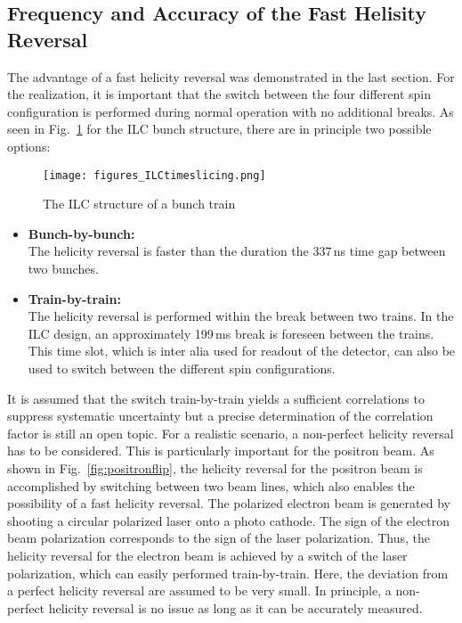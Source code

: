 \documentclass[a4paper]{article}
\begin{document}
\subsection{Frequency and Accuracy of the Fast Helisity Reversal}

The advantage of a fast helicity reversal was demonstrated in the last section. For the realization, it is important that the switch between the four different spin configuration is performed during normal operation with no additional breaks. As seen in Fig.~\ref{fig:bunchstrcture} for the ILC bunch structure, there are in principle two possible options:

\begin{figure}[htbp]
\centering
\texttt{[image: figures\_ILCtimeslicing.png]}
\caption{The ILC structure of a bunch train}
\label{fig:bunchstrcture}
\end{figure}

\begin{itemize}
	\item\textbf{Bunch-by-bunch:}\\
	The helicity reversal is faster than the duration the 337\,ns time gap between two bunches.
	\item\textbf{Train-by-train:}\\
	The helicity reversal is performed within the break between two trains. In the ILC design, an approximately 199\,ms break is foreseen between the trains. This time slot, which is inter alia used for readout of the detector, can also be used to switch between the different spin configurations.  
\end{itemize}

It is assumed that the switch train-by-train yields a sufficient correlations to suppress systematic uncertainty but a precise determination of the correlation factor is still an open topic. For a realistic scenario, a non-perfect helicity reversal has to be considered. This is particularly important for the positron beam. As shown in Fig.~\ref{fig:positronflip}, the helicity reversal for the positron beam is accomplished by switching between two beam lines, which also enables the possibility of a fast helicity reversal. The polarized electron beam is generated by shooting a circular polarized laser onto a photo cathode. The sign of the electron beam polarization corresponds to the sign of the laser polarization. Thus, the helicity reversal for the electron beam is achieved by a switch of the laser polarization, which can easily performed train-by-train. Here, the deviation from a perfect helicity reversal are assumed to be very small. In principle, a non-perfect helicity reversal is no issue as long as it can be accurately measured. 
\end{document}
